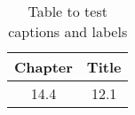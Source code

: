 \begin{table}[h!]
\centering
\begin{tabular}{cc}
{Chapter} & {Title} \\ 
\hline
{14.4} & {12.1} \\
\end{tabular}
\caption{Table to test captions and labels}
\label{table:1}
\end{table}